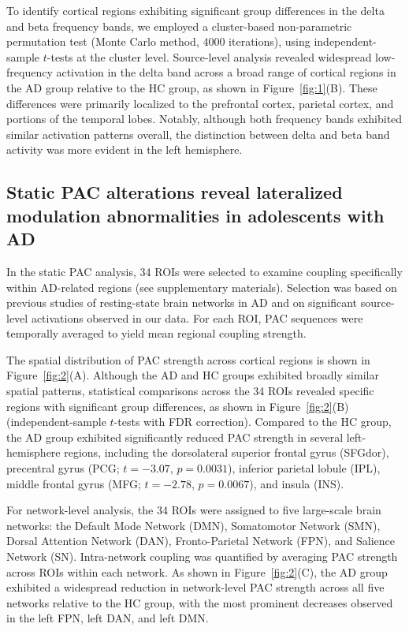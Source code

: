 \documentclass[lettersize,journal]{IEEEtran}
\begin{document}
To identify cortical regions exhibiting significant group differences in the delta and beta frequency bands, we employed a cluster-based non-parametric permutation test (Monte Carlo method, 4000 iterations), using independent-sample $t$-tests at the cluster level.  
Source-level analysis revealed widespread low-frequency activation in the delta band across a broad range of cortical regions in the AD group relative to the HC group, as shown in Figure~\ref{fig:1}(B).
These differences were primarily localized to the prefrontal cortex, parietal cortex, and portions of the temporal lobes. Notably, although both frequency bands exhibited similar activation patterns overall, the distinction between delta and beta band activity was more evident in the left hemisphere.

\subsection{Static PAC alterations reveal lateralized modulation abnormalities in adolescents with AD}  

In the static PAC analysis, 34 ROIs were selected to examine coupling specifically within AD-related regions (see supplementary materials). Selection was based on previous studies of resting-state brain networks in AD  \cite{sylvester2012functional, langhammer2024resting, janiri2020shared, chavanne2021overlapping} and on significant source-level activations observed in our data. For each ROI, PAC sequences were temporally averaged to yield mean regional coupling strength.

The spatial distribution of PAC strength across cortical regions is shown in Figure~\ref{fig:2}(A). Although the AD and HC groups exhibited broadly similar spatial patterns, statistical comparisons across the 34 ROIs revealed specific regions with significant group differences, as shown in Figure~\ref{fig:2}(B) (independent-sample $t$-tests with FDR correction).  
Compared to the HC group, the AD group exhibited significantly reduced PAC strength in several left-hemisphere regions, including the dorsolateral superior frontal gyrus (SFGdor), precentral gyrus (PCG; $t = -3.07$, $p = 0.0031$), inferior parietal lobule (IPL), middle frontal gyrus (MFG; $t = -2.78$, $p = 0.0067$), and insula (INS).

For network-level analysis, the 34 ROIs were assigned to five large-scale brain networks: the Default Mode Network (DMN), Somatomotor Network (SMN), Dorsal Attention Network (DAN), Fronto-Parietal Network (FPN), and Salience Network (SN). Intra-network coupling was quantified by averaging PAC strength across ROIs within each network. As shown in Figure~\ref{fig:2}(C), the AD group exhibited a widespread reduction in network-level PAC strength across all five networks relative to the HC group, with the most prominent decreases observed in the left FPN, left DAN, and left DMN.
\end{document}
